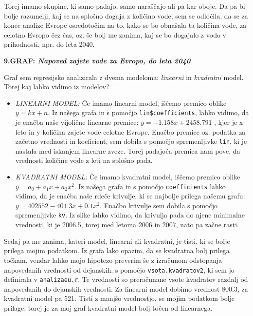 \documentclass[11pt,a4paper]{article}
\begin{document}
Torej imamo skupine, ki samo padajo, samo naraščajo ali pa kar oboje. Da pa bi bolje razumelji, kaj se na splošno dogaja z količino vode, sem se odločila, da se za konec analize Evrope osredotočim na to, kako se bo obnašala ta količina vode, za celotno Evropo čez čas, oz. še bolj me zanima, kaj se bo dogajalo z vodo v prihodnosti, npr. do leta 2040.

\newpage
\textbf{9.GRAF: \emph{Napoved zajete vode za Evropo, do leta 2040}}


Graf sem regresijsko analizirala z dvema modeloma: \emph{linearni} in \emph{kvadratni} model.\\
Torej kaj lahko vidimo iz modelov?
\begin{itemize}
\item{\emph{LINEARNI MODEL:} Če imamo linearni model, iščemo premico oblike $y = kx + n$. Iz našega grafa in s pomočjo \verb|lin$coefficients|, lahko vidimo, da je enačba naše vijolične linearne premice: $y = -1.158x + 2458.791$ , kjer je x leto in y količina zajete vode celotne Evrope. Enačbo premice oz. podatka za začetno vrednosti in koeficient, sem dobila s pomočjo spremenljivke \verb|lin|, ki je nastala med iskanjem linearne zveze. Torej padajoča premica nam pove, da vrednosti količine vode z leti na splošno pada.}

\item{\emph{KVADRATNI MODEL:} Če imamo kvadratni model, iščemo premico oblike $y = a_0 + a_1x +a_2x^2$. Iz našega grafa in s pomočjo \verb|coefficients| lahko vidimo, da je enačba naše rdeče krivulje, ki se najbolje prilega našemu grafu: $y = 402552 - 401.3x + 0.1x^2$. Enačbo krivulje sem dobila s pomočjo spremenljivke \verb|kv|. Iz slike lahko vidimo, da krivulja pada do njene minimalne vrednosti, ki je 2006.5, torej med letoma 2006 in 2007, nato pa začne rasti.}
\end{itemize}

Sedaj pa me zanima, kateri model, linearni ali kvadratni, je tisti, ki se bolje prilega mojim podatkom. Iz grafa lako opazim, da se kvadratna bolj prilega točkam, vendar lahko mojo hipotezo preverim še z izračunom odstopanja napovedanih vrednosti od dejanskih, s pomočjo \verb|vsota.kvadratov2|, ki sem jo definirala v \verb|analizaeu.r|. Te vrednosti so preračunane vsote kvadratov razdalj od napovedanih do dejanskih vrednosti. Za linearni model dobimo vrednost 800.3, za kvadratni model pa 521. Tisti z manjšo vrednostjo, se mojim podatkom bolje prilage, torej je za moj graf kvadratni model bolj točen od linearnega.\\
\end{document}
